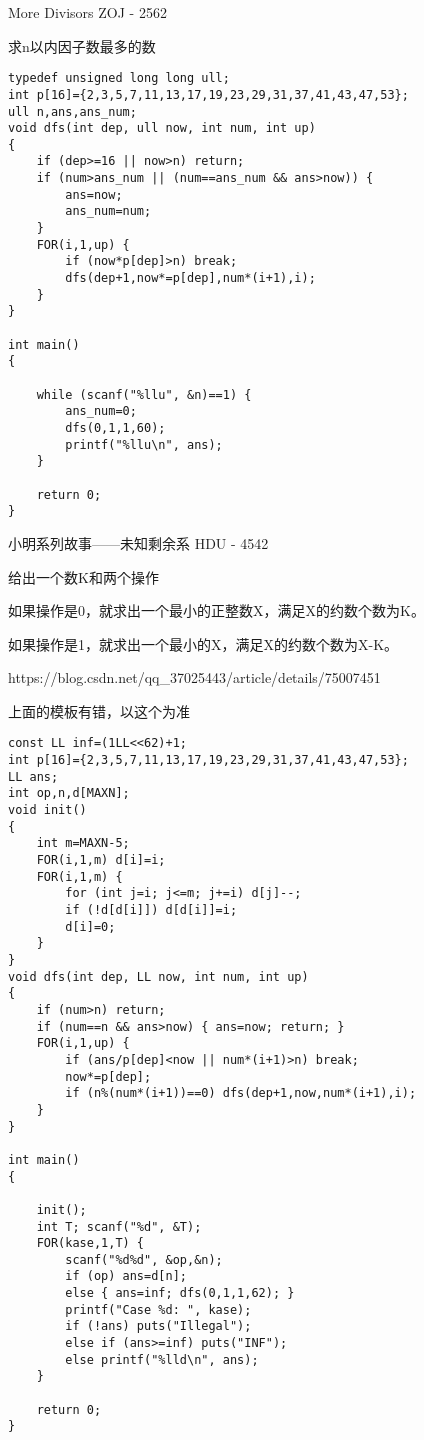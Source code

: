 More Divisors ZOJ - 2562

求n以内因子数最多的数

\begin{lstlisting}
typedef unsigned long long ull;
int p[16]={2,3,5,7,11,13,17,19,23,29,31,37,41,43,47,53};
ull n,ans,ans_num;
void dfs(int dep, ull now, int num, int up)
{
    if (dep>=16 || now>n) return;
    if (num>ans_num || (num==ans_num && ans>now)) {
        ans=now;
        ans_num=num;
    }
    FOR(i,1,up) {
        if (now*p[dep]>n) break;
        dfs(dep+1,now*=p[dep],num*(i+1),i);
    }
}

int main()
{

    while (scanf("%llu", &n)==1) {
        ans_num=0;
        dfs(0,1,1,60);
        printf("%llu\n", ans);
    }

    return 0;
}
\end{lstlisting}

小明系列故事——未知剩余系 HDU - 4542

给出一个数K和两个操作

如果操作是0，就求出一个最小的正整数X，满足X的约数个数为K。

如果操作是1，就求出一个最小的X，满足X的约数个数为X-K。

https://blog.csdn.net/qq\_37025443/article/details/75007451

上面的模板有错，以这个为准

\begin{lstlisting}
const LL inf=(1LL<<62)+1;
int p[16]={2,3,5,7,11,13,17,19,23,29,31,37,41,43,47,53};
LL ans;
int op,n,d[MAXN];
void init()
{
    int m=MAXN-5;
    FOR(i,1,m) d[i]=i;
    FOR(i,1,m) {
        for (int j=i; j<=m; j+=i) d[j]--;
        if (!d[d[i]]) d[d[i]]=i;
        d[i]=0;
    }
}
void dfs(int dep, LL now, int num, int up)
{
    if (num>n) return;
    if (num==n && ans>now) { ans=now; return; }
    FOR(i,1,up) {
        if (ans/p[dep]<now || num*(i+1)>n) break;
        now*=p[dep];
        if (n%(num*(i+1))==0) dfs(dep+1,now,num*(i+1),i);
    }
}

int main()
{

    init();
    int T; scanf("%d", &T);
    FOR(kase,1,T) {
        scanf("%d%d", &op,&n);
        if (op) ans=d[n];
        else { ans=inf; dfs(0,1,1,62); }
        printf("Case %d: ", kase);
        if (!ans) puts("Illegal");
        else if (ans>=inf) puts("INF");
        else printf("%lld\n", ans);
    }

    return 0;
}
\end{lstlisting}

